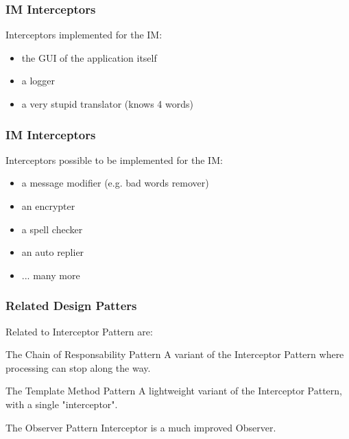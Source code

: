 \documentclass{beamer}
\begin{document}
\begin{frame}
  \frametitle{IM Interceptors}

  Interceptors implemented for the IM:
  \begin{itemize}
  \item the GUI of the application itself
  \item a logger
  \item a very stupid translator (knows 4 words)
  \end{itemize}

\end{frame}

\begin{frame}
  \frametitle{IM Interceptors}

  Interceptors possible to be implemented for the IM:
  \begin{itemize}
  \item a message modifier (e.g. bad words remover)
  \item an encrypter
  \item a spell checker
  \item an auto replier
  \item ... many more
  \end{itemize}

\end{frame}

\begin{frame}
  \frametitle{Related Design Patters}

  Related to Interceptor Pattern are:

  \begin{block}{The Chain of Responsability Pattern}
  A variant of the Interceptor Pattern where processing can stop along the way.
  \end{block}

  \begin{block}{The Template Method Pattern}
  A lightweight variant of the Interceptor Pattern, with a single "interceptor".
  \end{block}

  \begin{block}{The Observer Pattern}
  Interceptor is a much improved Observer.
  \end{block}

\end{frame}
\end{document}
